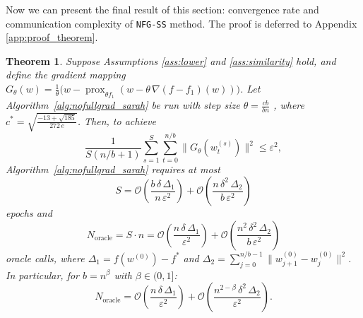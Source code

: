 \documentclass{article}
\DeclareMathOperator{\prox}{prox}
\newtheorem{theorem}{Theorem}
\begin{document}

Now we can present the final result of this section: convergence rate and
communication complexity of \texttt{NFG-SS} method. The proof is deferred to Appendix \ref{app:proof_theorem}. 

\begin{theorem}
\label{thm:convergence}
Suppose Assumptions \ref{ass:lower}
and \ref{ass:similarity} hold, and define the gradient mapping \\
$
    G_\theta(w) = \frac{1}{\theta}\Big(w - \prox_{\theta f_1} \left(w - \theta \, \nabla(f - f_1)(w) \right)\Big)
$.
Let Algorithm~\ref{alg:nofullgrad_sarah} be run 
with step size $\theta = \frac{cb}{\delta n}$ 
, where 
$c^* = \sqrt{\frac{-13+\sqrt{185}}{272\,e}}$.
Then, to achieve
\[
\frac{1}{S(n/b+1)}\sum_{s=1}^{S}\sum_{t=0}^{n/b}
\|G_\theta(w_t^{(s)})\|^2 \leq \varepsilon^2,
\]
Algorithm~\ref{alg:nofullgrad_sarah} requires at most
\[
S = \mathcal{O}\!\left(\frac{b\,\delta\,\Delta_1}
{n\,\varepsilon^2}\right) 
+ \mathcal{O}\!\left(\frac{n\,\delta^2\,\Delta_2}
{b\,\varepsilon^2}\right)
\]
epochs and
\[
N_{\text{oracle}} = S \cdot n 
= \mathcal{O}\!\left(\frac{n\,\delta\,\Delta_1}{\varepsilon^2}\right) 
+ \mathcal{O}\!\left(\frac{n^2\,\delta^2\,\Delta_2}
{b\,\varepsilon^2}\right)
\]
oracle calls, where 
$\Delta_1 = f(w^{(0)}) - f^*$ and 
$\Delta_2 = \sum_{j=0}^{n/b-1}
\|w_{j+1}^{(0)} - w_j^{(0)}\|^2$.
In particular, for $b = n^\beta$ with 
$\beta \in (0, 1]$:
\[
N_{\text{oracle}} 
= \mathcal{O}\!\left(\frac{n\,\delta\,\Delta_1}{\varepsilon^2}\right) 
+ \mathcal{O}\!\left(\frac{n^{2-\beta}\,\delta^2\,\Delta_2}
{\varepsilon^2}\right).
\]
\end{theorem}
\end{document}

